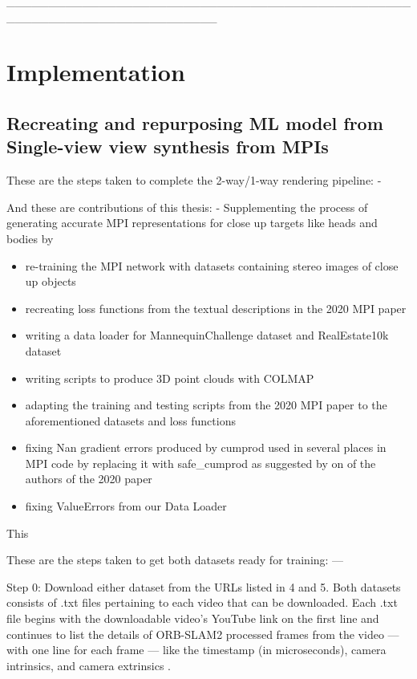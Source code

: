 _________________________________________________________________________

\chapter{Implementation}\label{ch:implementation}

\section{Recreating and repurposing ML model from Single-view view synthesis from MPIs}\label{sec:contributions}






These are the steps taken to complete the 2-way/1-way rendering pipeline: -

And these are contributions of this thesis: -
Supplementing the process of generating accurate MPI representations for close up targets like heads and bodies by 
\begin{itemize}
    \item re-training the MPI network with datasets containing stereo images of close up objects  
    \item recreating loss functions from the textual descriptions in the 2020 MPI paper
    \item writing a data loader for MannequinChallenge dataset and RealEstate10k dataset
    \item writing scripts to produce 3D point clouds with COLMAP
    \item adapting the training and testing scripts from the 2020 MPI paper to the aforementioned datasets and loss functions
    \item fixing Nan gradient errors produced by cumprod used in several places in MPI code by replacing it with safe\_cumprod as suggested by on of the authors of the 2020 paper
    \item fixing ValueErrors from our Data Loader
\end{itemize}
This 



These are the steps taken to get both datasets ready for training: ---

Step 0: Download either dataset from the URLs listed in 4 and 5. Both datasets consists of .txt files pertaining to each video that can be downloaded. Each .txt file begins with the downloadable video’s YouTube link on the first line and continues to list the details of ORB-SLAM2 processed frames from the video --- with one line for each frame --- like the timestamp (in microseconds), camera intrinsics, and camera extrinsics .

